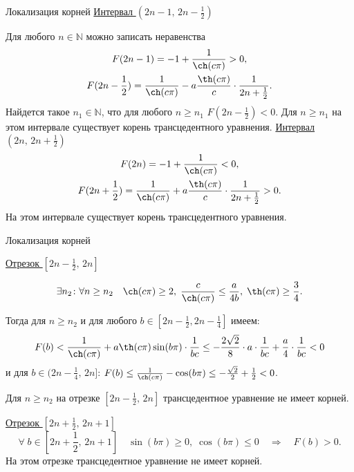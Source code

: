 \documentclass[10pt, ignoreonframetext,unicode]{beamer}
\begin{document}
\begin{frame}{Локализация корней}
	\underline{Интервал $(2n-1,\, 2n-\frac12)$}
	
	Для любого $n\in \mathbb{N}$ можно записать неравенства
	\begin{gather*}
	F(2n-1)=-1+\frac{1}{\ch(c\pi)}>0,\\
	F(2n-\frac12) = \frac{1}{\ch(c\pi)} - a\frac{\th(c\pi)}{c} \cdot \frac{1}{2n+\frac12}.
	\end{gather*}
	Найдется такое $n_1\in \mathbb{N}$, что для любого $n\ge n_1$ $F(2n - \frac12)<0$. Для $n\ge n_1$ на этом интервале существует корень трансцедентного уравнения.
	\underline{Интервал $(2n,\,2n + \frac12)$}
	\begin{gather*}
	F(2n)=-1+\frac{1}{\ch(c\pi)}<0,\\
	F(2n+\frac12) = \frac{1}{\ch(c\pi)} + a\frac{\th(c\pi)}{c} \cdot \frac{1}{2n+\frac12}>0.
	\end{gather*}
	На этом интервале существует корень трансцедентного уравнения. 
\end{frame}

\begin{frame}{Локализация корней}
	
	\underline{Отрезок $[2n-\frac12,\,2n]$}
	
	\[
		\exists n_2\colon\forall n\ge n_2 \quad \ch(c\pi)\ge 2,\; \frac{c}{\ch(c\pi)}\le \frac{a}{4b},\; \th(c\pi)\ge\frac34.
	\]
	
	Тогда для $n\ge n_2$ и для любого $b\in [2n-\frac12,2n-\frac14]$ имеем:
	\[
	F(b)<\frac{1}{\ch(c\pi)} + a\th(c\pi)\sin(b\pi)\cdot\frac{1}{bc}\le -\frac{2\sqrt{2}}{8}\cdot a\cdot\frac{1}{bc} + \frac{a}{4}\cdot\frac{1}{bc} <0
	\]
	и для $b\in(2n-\frac14,\,2n]$: $F(b)\le \frac{1}{\ch(c\pi)}-\cos(b\pi)\le -\frac{\sqrt{2}}{2}+\frac12<0$.
	
	Для $n\ge n_2$ на отрезке $[2n-\frac12,\,2n]$ трансцедентное уравнение не имеет корней.
	
	\underline{Отрезок $[2n+\frac12,\,2n+1]$}
	\[
	\forall\; b\in [2n+\frac12,\,2n+1] \quad \sin(b\pi)\ge 0,\; \cos(b\pi)\le 0 \quad \Rightarrow \quad F(b)>0.
	\]
	На этом отрезке трансцедентное уравнение не имеет корней.
	
\end{frame}
\end{document}
